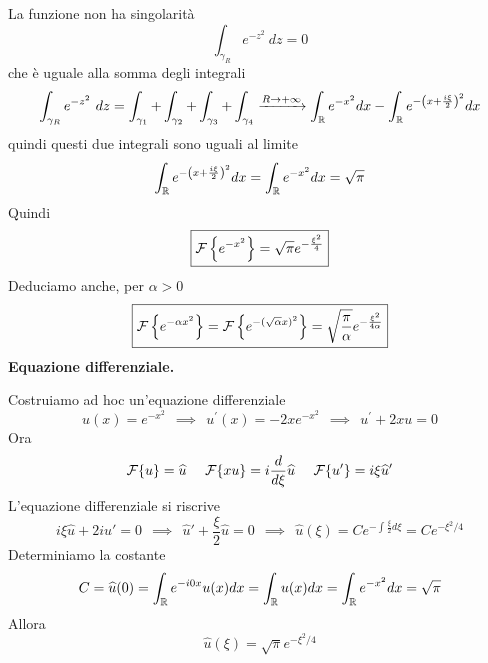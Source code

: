 La funzione non ha singolarità
\begin{equation*}
\int _{\gamma _{R}} e^{-z^{2}} \ dz=0
\end{equation*}
che è uguale alla somma degli integrali
\begin{equation*}
\int _{\gamma _{R}} e^{-z^{2}} \ dz=\int _{\gamma _{1}} +\int _{\gamma _{2}} +\int _{\gamma _{3}} +\int _{\gamma _{4}}\xrightarrow{R\rightarrow +\infty }\int _{\mathbb{R} } e^{-x^{2}} dx-\int _{\mathbb{R} } e^{-\left( x+\frac{i\xi }{2}\right)^{2}} dx
\end{equation*}
quindi questi due integrali sono uguali al limite
\begin{equation*}
\int _{\mathbb{R} } e^{-\left( x+\frac{i\xi }{2}\right)^{2}} dx=\int _{\mathbb{R} } e^{-x^{2}} dx=\sqrt{\pi }
\end{equation*}
Quindi
\begin{equation*}
\boxed{\mathcal{F} \left\{e^{-x^{2}}\right\} =\sqrt{\pi } e^{-\frac{\xi ^{2}}{4}}}
\end{equation*}
Deduciamo anche, per $\alpha  >0$
\begin{equation*}
\boxed{\mathcal{F} \left\{e^{-\alpha x^{2}}\right\} =\mathcal{F} \left\{e^{-(\sqrt{\alpha } x)^{2}}\right\} =\sqrt{\frac{\pi }{\alpha }} e^{-\frac{\xi ^{2}}{4\alpha }}}
\end{equation*}
\textbf{Equazione differenziale.}

Costruiamo ad hoc un'equazione differenziale
\begin{equation*}
u(x)=e^{-x^{2}} \ \ \implies \ \ u^{'} (x)=-2xe^{-x^{2}} \ \ \implies \ \ u^{'} +2xu=0
\end{equation*}
Ora
\begin{equation*}
\mathcal{F} \{u\} =\widehat{u} \ \ \ \ \mathcal{F} \{xu\} =i\frac{d}{d\xi }\widehat{u} \ \ \ \ \mathcal{F} \{u'\} =i\xi \widehat{u} '
\end{equation*}
L'equazione differenziale si riscrive
\begin{equation*}
i\xi \hat{u} +2i\hat{u} '=0\ \ \implies \ \ \hat{u} '+\frac{\xi }{2}\hat{u} =0\ \ \implies \ \ \hat{u}( \xi ) =Ce^{-\int \frac{\xi }{2} d\xi } =Ce^{-\xi ^{2} /4}
\end{equation*}
Determiniamo la costante
\begin{equation*}
C=\widehat{u}( 0) =\int _{\mathbb{R} } e^{-i0x} u( x) dx=\int _{\mathbb{R} } u( x) dx=\int _{\mathbb{R} } e^{-x^{2}} dx=\sqrt{\pi }
\end{equation*}
Allora
\begin{equation*}
\boxed{\hat{u}( \xi ) =\sqrt{\pi } e^{-\xi ^{2} /4}}
\end{equation*}
\Soluzione

